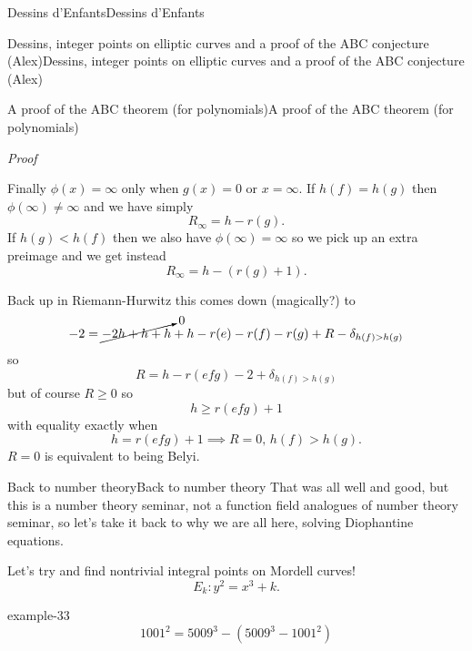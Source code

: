 \documentclass[10pt,]{book}
\makeatletter
\renewcommand*{\proofname}{Proof}
\renewenvironment{proof}[1][\proofname]{\par
  \pushQED{\qed}%
  \normalfont \topsep6\p@\@plus6\p@\relax
  \trivlist
  \item\relax
    {\itshape
    #1\@addpunct{.}}\hspace\labelsep\ignorespaces
}{%
  \popQED\endtrivlist\@endpefalse
}
\numberwithin{equation}{section}
\newcommand{\lt}{<}
\newcommand{\gt}{>}
\makeatother
\begin{document}
\begin{chapterptx}{Dessins d'Enfants}{}{Dessins d'Enfants}{}{}
\begin{sectionptx}{Dessins, integer points on elliptic curves and a proof of the ABC conjecture (Alex)}{}{Dessins, integer points on elliptic curves and a proof of the ABC conjecture (Alex)}{}{}
\begin{subsectionptx}{A proof of the ABC theorem (for polynomials)}{}{A proof of the ABC theorem (for polynomials)}{}{}
\begin{proof}
\begin{equation*}
\end{equation*}
Finally \(\phi(x) = \infty\) only when \(g(x) = 0\) or \(x = \infty\). If \(h(f) = h(g)\) then \(\phi(\infty) \ne \infty\) and we have simply%
\begin{equation*}
R_\infty = h - r(g)\text{.}
\end{equation*}
If \(h(g) \lt h(f)\) then we also have \(\phi(\infty) = \infty\) so we pick up an extra preimage and we get instead%
\begin{equation*}
R_\infty = h - (r(g) + 1)\text{.}
\end{equation*}
%
\par
\hypertarget{p-704}{}%
Back up in Riemann-Hurwitz this comes down (magically?) to%
\begin{equation*}
-2 = \cancelto{0}{-2 h + h + h} + h - r(e) -r(f) - r(g) + R - \delta_{h(f) \gt h(g)}
\end{equation*}
so%
\begin{equation*}
R = h - r(efg) - 2 + \delta_{h(f) \gt h(g)}
\end{equation*}
but of course \(R \ge 0\) so%
\begin{equation*}
h \ge r(efg) + 1
\end{equation*}
with equality exactly when%
\begin{equation*}
h = r(efg) + 1 \implies R = 0,\, h(f) \gt h(g)\text{.}
\end{equation*}
\(R= 0\) is equivalent to being Belyi.%
\end{proof}
\end{subsectionptx}
%
%
\typeout{************************************************}
\typeout{************************************************}
%
\begin{subsectionptx}{Back to number theory}{}{Back to number theory}{}{}\label{subsection-63}
\hypertarget{p-705}{}%
That was all well and good, but this is a number theory seminar, not a function field analogues of number theory seminar, so let's take it back to why we are all here, solving Diophantine equations.%
\par
\hypertarget{p-706}{}%
Let's try and find nontrivial integral points on Mordell curves!%
\begin{equation*}
E_k\colon y^2 = x^3 + k\text{.}
\end{equation*}
%
\begin{example}{}{example-33}%
\hypertarget{p-707}{}%
%
\begin{equation*}
1001^2 = 5009^3 - (5009^3 - 1001^2)

\end{equation*}
\end{example}
\end{subsectionptx}
\end{sectionptx}
\end{chapterptx}
\end{document}
